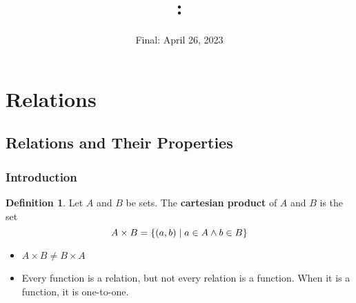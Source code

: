\documentclass[article, 12pt]{article}
\title{
    \vspace{2in}
    \textmd{\textbf{\courseNumber: \courseName}}
    \normalsize\vspace{0.1in}\\
    \vspace{0.1in}\large{\text{\professor}}
    \vspace{3in}
}
\author{\name}
\date{Final: April 26, 2023}
\theoremstyle{definition}
\newtheorem{definition}{Definition}
\DeclarePairedDelimiter\set{\{}{\}}
\begin{document}
    \maketitle
    \thispagestyle{empty}
    \pagebreak
    \tableofcontents
    \pagebreak
    \setcounter{section}{8}
    \section{Relations}
    \subsection{Relations and Their Properties}
    \subsubsection{Introduction}
    \begin{definition}\label{def:cartesian product}
            Let $A$ and $B$ be sets. The \textbf{cartesian product} of $A$ and $B$ is the set
                \[ A \times B = \set*{(a, b) \mid a \in A \land b \in B} \]
        \end{definition}
        \begin{itemize}
            \item $A \times B \neq B \times A$
            \item Every function is a relation, but not every relation is a function. When it is a function, it is one-to-one.
        \end{itemize}
    
\end{document}
